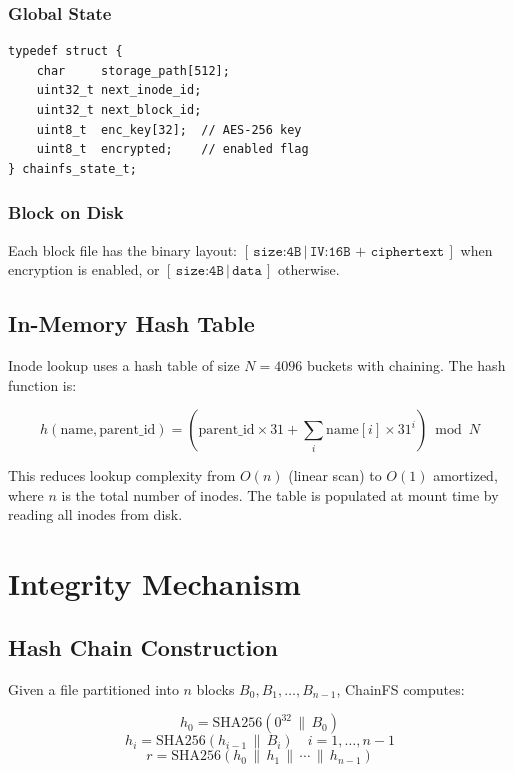 \documentclass[10pt,twocolumn]{article}
\begin{document}
\subsubsection{Global State}

\begin{lstlisting}[caption={Filesystem state}]
typedef struct {
    char     storage_path[512];
    uint32_t next_inode_id;
    uint32_t next_block_id;
    uint8_t  enc_key[32];  // AES-256 key
    uint8_t  encrypted;    // enabled flag
} chainfs_state_t;
\end{lstlisting}

\subsubsection{Block on Disk}

Each block file has the binary layout:
$[\,\texttt{size:4B}\,|\,
\texttt{IV:16B + ciphertext}\,]$
when encryption is enabled, or
$[\,\texttt{size:4B}\,|\,\texttt{data}\,]$
otherwise.

\subsection{In-Memory Hash Table}

Inode lookup uses a hash table of size
$N = 4096$ buckets with chaining.
The hash function is:

\[
h(\text{name}, \text{parent\_id}) =
\left(\text{parent\_id} \times 31 +
\sum_{i} \text{name}[i] \times 31^i
\right) \bmod N
\]

This reduces lookup complexity from
$O(n)$ (linear scan) to $O(1)$
amortized, where $n$ is the total
number of inodes.
The table is populated at mount time
by reading all inodes from disk.

\section{Integrity Mechanism}

\subsection{Hash Chain Construction}

Given a file partitioned into $n$ blocks
$B_0, B_1, \ldots, B_{n-1}$,
ChainFS computes:

\[
h_0 = \text{SHA256}(0^{32} \,\|\, B_0)
\]
\[
h_i = \text{SHA256}(h_{i-1} \,\|\, B_i)
\quad i = 1, \ldots, n-1
\]
\[
r = \text{SHA256}(h_0 \,\|\, h_1
\,\|\, \cdots \,\|\, h_{n-1})
\]
\end{document}
